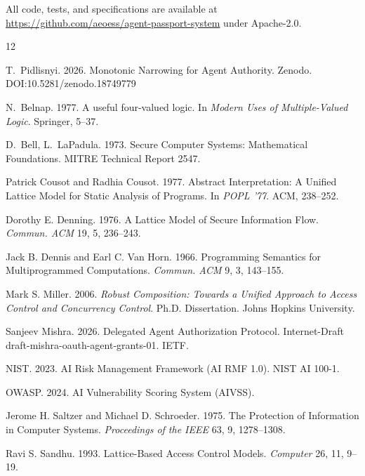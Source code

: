 \documentclass[sigconf,nonacm]{acmart}
\begin{document}
All code, tests, and specifications are available at
\url{https://github.com/aeoess/agent-passport-system} under Apache-2.0.


\begin{thebibliography}{12}

T.~Pidlisnyi. 2026. Monotonic Narrowing for Agent Authority.
Zenodo. DOI:10.5281/zenodo.18749779

N.~Belnap. 1977. A useful four-valued logic.
In \emph{Modern Uses of Multiple-Valued Logic}. Springer, 5--37.

D.~Bell, L.~LaPadula. 1973. Secure Computer Systems: Mathematical Foundations.
MITRE Technical Report 2547.

Patrick Cousot and Radhia Cousot. 1977. Abstract Interpretation: A Unified Lattice
Model for Static Analysis of Programs. In \emph{POPL '77}. ACM, 238--252.

Dorothy E. Denning. 1976. A Lattice Model of Secure Information Flow. \emph{Commun. ACM}
19, 5, 236--243.

Jack B. Dennis and Earl C. Van Horn. 1966. Programming Semantics for Multiprogrammed
Computations. \emph{Commun. ACM} 9, 3, 143--155.

Mark S. Miller. 2006. \emph{Robust Composition: Towards a Unified Approach to Access
Control and Concurrency Control}. Ph.D. Dissertation. Johns Hopkins University.

Sanjeev Mishra. 2026. Delegated Agent Authorization Protocol.
Internet-Draft draft-mishra-oauth-agent-grants-01. IETF.

NIST. 2023. AI Risk Management Framework (AI RMF 1.0). NIST AI 100-1.

OWASP. 2024. AI Vulnerability Scoring System (AIVSS).

Jerome H. Saltzer and Michael D. Schroeder. 1975. The Protection of Information in
Computer Systems. \emph{Proceedings of the IEEE} 63, 9, 1278--1308.

Ravi S. Sandhu. 1993. Lattice-Based Access Control Models. \emph{Computer} 26, 11, 9--19.

\end{thebibliography}
\end{document}
